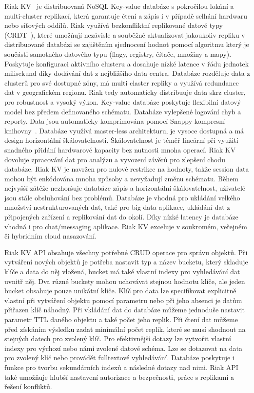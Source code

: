 \documentclass[czech,bachelor,dept460,male,csharp,cpdeclaration]{diploma}
\begin{document}
	Riak KV~\cite{riak} je distribuovaná NoSQL Key-value databáze s pokročilou lokání a multi-cluster replikací, která garantuje čtení a zápis i v případě selhání hardwaru nebo síťových oddílů. Riak využívá bezkonfliktní replikované datové typy (CRDT~\cite{crdt}), které umožňují nezávisle a souběžně aktualizovat jakoukoliv repliku v distribuované databázi se zajištěním sjednocení hodnot pomocí algoritmu který je součásti samotného datového typu (flagy, registry, čítače, množiny a mapy). Poskytuje konfiguraci aktivního clusteru a dosahuje nízké latence v řádu jednotek milisekund díky dodávání dat z nejbližšího data centra. Databáze rozděluje data z clusterů pro své dostupné zóny, má multi claster repliky a využívá redundance dat v geografickém regionu. Riak tedy automaticky distribuuje data skrz cluster, pro robustnost a vysoký výkon. Key-value databáze poskytuje flexibilní datový model bez předem definovaného schématu. Databáze vylepšené logování chyb a reporty. Data jsou automaticky komprimována pomocí Snappy kompresní knihovny~\cite{snappy}. Databáze využívá master-less architekturu, je vysoce dostupná a má design horizontální škálovatelnosti. Škálovatelnost je téměř lineární při využití snadného přidání hardwarové kapacity bez nutnosti mnoha operací. Riak KV dovoluje zpracování dat pro analýzu a vyvození závěrů pro zlepšení chodu databáze. Riak KV je navržen pro nulové restrikce na hodnoty, takže session data mohou být enkódována mnoha způsoby a nevyžadují změnu schématu. Během nejvyšší zátěže nezhoršuje databáze zápis a horizontální škálovatelnost, uživatelé jsou stále obsluhování bez problémů. Databáze je vhodná pro ukládání velkého množství nestrukturovaných dat, také pro big-data aplikace, ukládání dat z připojených zařízení a replikování dat do okolí. Díky nízké latency je databáze vhodná i pro chat/messaging aplikace. Riak KV exceluje v soukromém, veřejném či hybridním cloud nasazování.
	
	Riak KV API obsahuje všechny potřebné CRUD operace pro správu objektů. Při vytváření nových objektů je potřeba nastavit typ a název bucketu, který skladuje klíče a data do něj vložená, bucket má také vlastní indexy pro vyhledávání dat uvnitř něj. Dva různé buckety mohou uchovávat stejnou hodnotu klíče, ale jeden bucket obsahuje pouze unikátní klíče. Klíč pro data lze specifikovat explicitně vlastní při vytváření objektu pomocí parametru nebo při jeho absenci je datům přiřazen klíč náhodný. Při vkládání dat do databáze můžeme jednoduše nastavit parametr TTL daného objektu a také počet jeho replik. Při čtení dat můžeme před získáním výsledku zadat minimální počet replik, které se musí shodnout na stejných datech pro zvolený klíč. Pro efektivnější dotazy lze vytvořit vlastní indexy pro výchozí nebo námi zvolené datové schéma. Lze se dotazovat na data pro zvolený klíč nebo provádět fulltextové vyhledávání. Databáze poskytuje i funkce pro tvorbu sekundárních indexů a následné dotazy nad nimi. Riak API také umožňuje hlubší nastavení autorizace a bezpečnosti, práce s replikami a řešení konfliktů.
	
\end{document}
